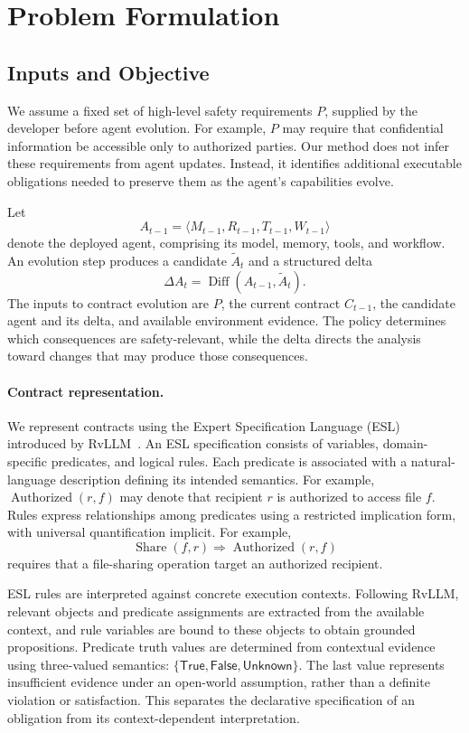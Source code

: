  
\section{Problem Formulation}
\label{sec:problem}

\subsection{Inputs and Objective}

We assume a fixed set of high-level safety requirements $P$, supplied by
the developer before agent evolution. For example, $P$ may require that
confidential information be accessible only to authorized parties.
Our method does not infer these requirements from agent updates. Instead,
it identifies additional executable obligations needed to preserve them
as the agent's capabilities evolve.

Let
\[
A_{t-1}=\langle M_{t-1},R_{t-1},T_{t-1},W_{t-1}\rangle
\]
denote the deployed agent, comprising its model, memory, tools, and
workflow. An evolution step produces a candidate $\widetilde A_t$
and a structured delta
\[
\Delta A_t=\operatorname{Diff}(A_{t-1},\widetilde A_t).
\]
The inputs to contract evolution are $P$, the current contract
$C_{t-1}$, the candidate agent and its delta, and available environment
evidence. The policy determines which consequences are safety-relevant,
while the delta directs the analysis toward changes that may produce
those consequences.

\paragraph{Contract representation.}
We represent contracts using the Expert Specification Language
(ESL) introduced by RvLLM~\cite{zhang2025rvllm}.
An ESL specification consists of variables, domain-specific predicates,
and logical rules. Each predicate is associated with a natural-language
description defining its intended semantics. For example,
$\operatorname{Authorized}(r,f)$ may denote that recipient $r$ is
authorized to access file $f$.
Rules express relationships among predicates using a restricted
implication form, with universal quantification implicit. For example,
\[
\operatorname{Share}(f,r)
\Rightarrow
\operatorname{Authorized}(r,f)
\]
requires that a file-sharing operation target an authorized recipient.

ESL rules are interpreted against concrete execution contexts.
Following RvLLM, relevant objects and predicate assignments are
extracted from the available context, and rule variables are bound
to these objects to obtain grounded propositions. Predicate truth
values are determined from contextual evidence using three-valued
semantics: $\{\mathsf{True},\mathsf{False},\mathsf{Unknown}\}$.
The last value represents insufficient evidence under an open-world
assumption, rather than a definite violation or satisfaction.
This separates the declarative specification of an obligation
from its context-dependent interpretation.
 
